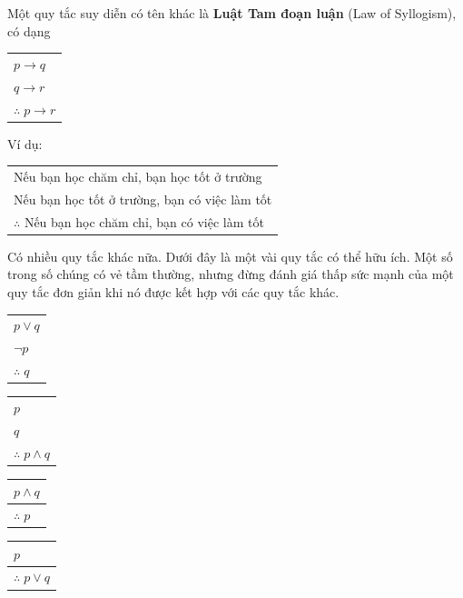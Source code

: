 Một quy tắc suy diễn có tên khác là \textbf{Luật Tam đoạn luận} (Law of Syllogism), có dạng
\begin{center}
\begin{tabular}{l}
$p \to q$ \\
$q \to r$ \\
\hline
$\therefore\; p \to r$
\end{tabular}
\end{center}
Ví dụ:
\begin{center}
\begin{tabular}{l}
Nếu bạn học chăm chỉ, bạn học tốt ở trường \\
Nếu bạn học tốt ở trường, bạn có việc làm tốt \\
\hline
$\therefore$ Nếu bạn học chăm chỉ, bạn có việc làm tốt
\end{tabular}
\end{center}

Có nhiều quy tắc khác nữa. Dưới đây là một vài quy tắc có thể hữu ích. Một số trong số chúng có vẻ tầm thường, nhưng đừng đánh giá thấp sức mạnh của một quy tắc đơn giản khi nó được kết hợp với các quy tắc khác.
\begin{center}
\begin{minipage}{0.2\textwidth}
\begin{tabular}{l}
$p \lor q$ \\
$\neg p$ \\
\hline
$\therefore\; q$
\end{tabular}
\end{minipage}
\hfill
\begin{minipage}{0.2\textwidth}
\begin{tabular}{l}
$p$ \\
$q$ \\
\hline
$\therefore\; p \land q$
\end{tabular}
\end{minipage}
\hfill
\begin{minipage}{0.2\textwidth}
\begin{tabular}{l}
$p \land q$ \\
\hline
$\therefore\; p$
\end{tabular}
\end{minipage}
\hfill
\begin{minipage}{0.2\textwidth}
\begin{tabular}{l}
$p$ \\
\hline
$\therefore\; p \lor q$
\end{tabular}
\end{minipage}
\end{center}

